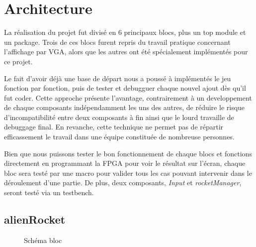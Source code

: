 \documentclass[french]{nakrule}
\begin{document}
\asymmetricalPage
\chapter{Architecture}
\label{architecture}

La réalisation du projet fut divisé en 6 principaux blocs, plus un top module et
un package. Trois de ces blocs furent repris du travail pratique concernant
l'affichage par VGA, alors que les autres ont été spécialement implémentés pour
ce projet.

Le fait d'avoir déjà une base de départ nous a poussé à implémentés le jeu
fonction par fonction, puis de tester et debugguer chaque nouvel ajout dès qu'il
fut coder. Cette approche présente l'avantage, contrairement à un developpement
de chaque composants indépendamment les uns des autres, de réduire le risque
d'incompatibilité entre deux composants à fin ainsi que le lourd travaille de
debuggage final. En revanche, cette technique ne permet pas de répartir
efficassement le travail dans une équipe constituée de nombreuse personnes.

Bien que nous puissons tester le bon fonctionnement de chaque blocs et fonctions
directement en programmant la FPGA pour voir le résultat sur l'écran, chaque
bloc sera testé par une macro pour valider tous les cas pouvant intervenir dans
le déroulement d'une partie. De plus, deux composants, \emph{Input} et
\emph{rocketManager}, seront testé via un testbench.

\symmetricalPage

\section{alienRocket}
\label{sec:alienRocket}


\begin{figure}
\caption{Schéma bloc}
\label{alienRocketBloc}
\end{figure}
\end{document}
